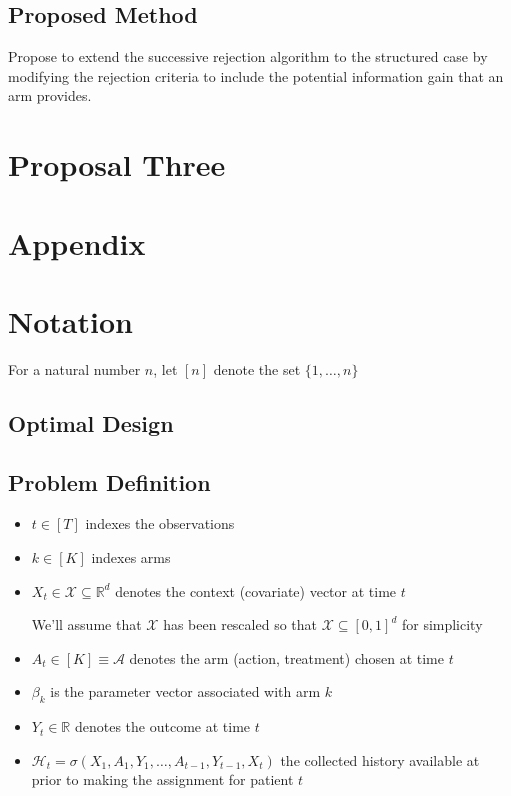 \documentclass[12pt,,letterpaper,twoside]{report}
\begin{document}
\subsection{Proposed Method}

Propose to extend the successive rejection algorithm to the structured
case by modifying the rejection criteria to include the potential
information gain that an arm provides.

\hypertarget{proposal-three}{%
\section{Proposal Three}\label{proposal-three}}

\hypertarget{appendix}{%
\section{Appendix}\label{appendix}}

\section{Notation}

For a natural number \(n\), let \([n]\) denote the set
\(\{1, \ldots, n\}\)

\hypertarget{optimal-design-1}{%
\subsection{Optimal Design}\label{optimal-design-1}}

\hypertarget{problem-definition-1}{%
\subsection{Problem Definition}\label{problem-definition-1}}

\begin{itemize}
    
\item $t \in [T]$ indexes the observations

\item $k \in [K]$ indexes arms 

\item $X_t \in  \mathcal{X} \subseteq \mathbb{R}^d$ denotes the context (covariate) vector at time $t$

We'll assume that $\mathcal{X}$ has been rescaled so that $\mathcal{X} \subseteq [0, 1]^d$ for simplicity

\item $A_t \in [K] \equiv \mathcal{A}$ denotes the arm (action, treatment) chosen at time $t$
     

 \item $\beta_k$ is the parameter vector associated with arm $k$

\item $Y_t \in \mathbb{R}$ denotes the outcome at time $t$

\item $\mathcal{H}_t = \sigma(X_1, A_1, Y_1, \ldots, A_{t - 1}, Y_{t -1}, X_t)$ the collected history available at prior to making the assignment for patient $t$
\end{itemize}
\end{document}
